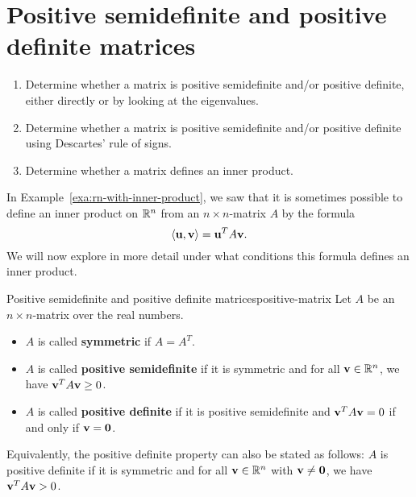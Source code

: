 \section{Positive semidefinite and positive definite matrices}

\begin{outcome}
  \begin{enumerate}
  \item Determine whether a matrix is positive semidefinite and/or
    positive definite, either directly or by looking at the
    eigenvalues.
  \item Determine whether a matrix is positive semidefinite and/or
    positive definite using Descartes' rule of signs.
  \item Determine whether a matrix defines an inner product.
  \end{enumerate}
\end{outcome}

In Example~\ref{exa:rn-with-inner-product}, we saw that it is
sometimes possible to define an inner product on $\mathbb{R}^n$ from an
$n\times n$-matrix $A$ by the formula
\begin{equation*}
  \iprod{\vect{u},\vect{v}} = \vect{u}^T A \vect{v}.
\end{equation*}
We will now explore in more detail under what conditions this formula
defines an inner product.

\begin{definition}{Positive semidefinite and positive definite matrices}{positive-matrix}
  Let $A$ be an $n\times n$-matrix over the real numbers.
  \begin{itemize}
  \item $A$ is called \textbf{symmetric}%
     if $A=A^T$.
  \item $A$ is called \textbf{positive semidefinite}%
     if it is symmetric and for all
    $\vect{v}\in\R^n$, we have $\vect{v}^TA\vect{v}\geq 0$.
  \item $A$ is called \textbf{positive definite}%
     if it is positive semidefinite
    and $\vect{v}^TA\vect{v}=0$ if and only if $\vect{v}=\vect{0}$.
\end{itemize}
\end{definition}

Equivalently, the positive definite property can also be stated as
follows: $A$ is positive definite if it is symmetric and for all
$\vect{v}\in\R^n$ with $\vect{v}\neq\vect{0}$, we have
$\vect{v}^TA\vect{v}>0$.


